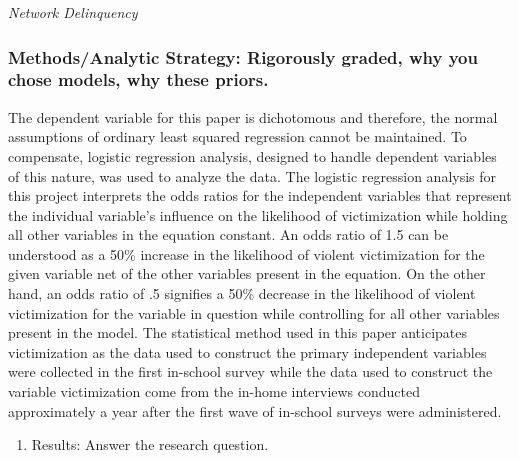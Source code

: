 \documentclass[]{article}
\providecommand{\tightlist}{%
  \setlength{\itemsep}{0pt}\setlength{\parskip}{0pt}}
\begin{document}
\emph{Network Delinquency}

\subsubsection{Methods/Analytic Strategy: Rigorously graded, why you
chose models, why these
priors.}\label{methodsanalytic-strategy-rigorously-graded-why-you-chose-models-why-these-priors.}

The dependent variable for this paper is dichotomous and therefore, the
normal assumptions of ordinary least squared regression cannot be
maintained. To compensate, logistic regression analysis, designed to
handle dependent variables of this nature, was used to analyze the data.
The logistic regression analysis for this project interprets the odds
ratios for the independent variables that represent the individual
variable's influence on the likelihood of victimization while holding
all other variables in the equation constant. An odds ratio of 1.5 can
be understood as a 50\% increase in the likelihood of violent
victimization for the given variable net of the other variables present
in the equation. On the other hand, an odds ratio of .5 signifies a 50\%
decrease in the likelihood of violent victimization for the variable in
question while controlling for all other variables present in the model.
The statistical method used in this paper anticipates victimization as
the data used to construct the primary independent variables were
collected in the first in-school survey while the data used to construct
the variable victimization come from the in-home interviews conducted
approximately a year after the first wave of in-school surveys were
administered.

\begin{enumerate}
\def\labelenumi{(\arabic{enumi})}
\setcounter{enumi}{5}
\tightlist
\item
  Results: Answer the research question.
\end{enumerate}
\end{document}
